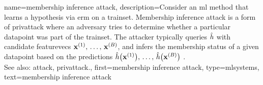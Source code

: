 {name={membership inference attack}, 
	description={Consider an \gls{ml} method that learns a \gls{hypothesis} 
		via \gls{erm} on a \gls{trainset}. Membership \gls{inference} 
                \gls{attack} is a form of \gls{privattack} where an adversary tries 
		to determine whether a particular \gls{datapoint} was part 
		of the \gls{trainset}. The attacker typically queries 
		$\hat{h}$ with candidate \glspl{featurevec} 
		${\bf x}^{(1)},\,\ldots,\,{\bf x}^{(B)}$, 
		and infers the membership status of a given \gls{datapoint} 
		based on the \glspl{prediction} $\hat{h}\big({\bf x}^{(1)}\big),\,\ldots,
		\,\hat{h}\big({\bf x}^{(B)}\big)$ \cite{Shokri2017}.
		\\ 
		See also: \gls{attack}, \gls{privattack}.}, 
 	first={membership inference attack}, 
	type=mlsystems,
 	text={membership inference attack}
}

